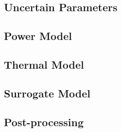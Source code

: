 \subsection{Uncertain Parameters} 


\subsection{Power Model} 


\subsection{Thermal Model} 


\subsection{Surrogate Model} 


\subsection{Post-processing} 

